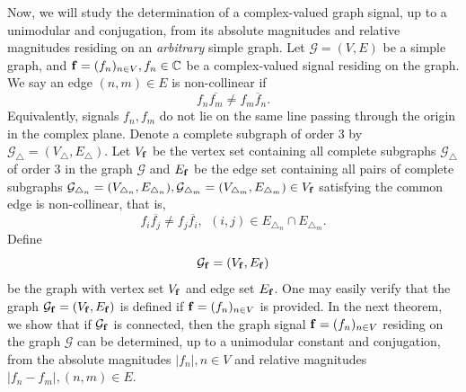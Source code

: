 \documentclass[12pt,oneside,reqno]{amsart}
\newcommand{\C}{\mathbb{C}}
\numberwithin{equation}{section}
\begin{document}
	Now, we will study the determination of a complex-valued graph signal, up to a unimodular and conjugation, from its absolute magnitudes and relative magnitudes residing on  an {\em arbitrary} simple graph. 
	Let  ${\mathcal G}=(V, E)$ be a simple graph, and  ${\bf f}=(f_n)_{n\in V}, f_n\in \C$ be a complex-valued  signal residing on the graph. 	We say an edge $(n,m)\in E$ is  non-collinear if 
	\begin{equation}\label{noncollinear.def}
		{f}_n \overline{{f}_m} \ne  {f}_m \overline{f}_n. \end{equation}
	Equivalently, signals $f_n, f_m$  do not lie on the same line passing through the origin in the complex plane.
	 Denote  a complete subgraph of order $3$ by 
	${\mathcal G}_\triangle=(V_\triangle, E_\triangle)$.   Let $V_{\bf f}$ be the vertex set containing all complete subgraphs ${\mathcal G}_\triangle$ of order $3$
    in the graph $\mathcal G$  and  $E_{\bf f}$ be
	the edge set containing   all pairs  of
	complete subgraphs  ${\mathcal G}_{\triangle_n}=(V_{\triangle_n}, E_{\triangle_n}), {\mathcal G}_{\triangle_m}=(V_{\triangle_m}, E_{\triangle_m}) \in V_{\bf f}$ satisfying the  common edge is non-collinear, that is, 
	$$f_i\overline{f_j}\neq f_j \overline{f_i}, \ \  (i, j)\in E_{\triangle_n}\cap  E_{\triangle_m}. $$ 
	Define 
	\begin{equation}\label{gf.def}
		{\mathcal G}_{\bf f}=(V_{\bf f}, E_{\bf f})
	\end{equation}
	be the graph with vertex set $V_{\bf f}$ and edge set  $E_{\bf f}$. 
	One may easily verify that the graph  ${\mathcal G}_{\bf f}=(V_{\bf f}, E_{\bf f})$ is defined if ${\bf f}=(f_n)_{n\in V}$ is provided. In the next theorem, we show that if ${\mathcal G}_{\bf f}$ is connected, then the graph signal  ${\bf f}=(f_n)_{n\in V}$ residing on the graph $\mathcal G$ can be determined, up to a unimodular constant and conjugation,  from the absolute magnitudes $|f_n|, n\in V$ and relative magnitudes  $|f_n-f_m|, (n, m)\in E$. 
	
	
	
\end{document}
